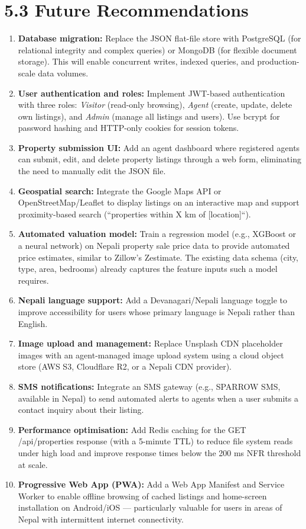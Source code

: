 \documentclass[12pt,a4paper]{report}
\begin{document}
\section{5.3 Future Recommendations}
\begin{enumerate}
  \item \textbf{Database migration:} Replace the JSON flat-file store with PostgreSQL (for relational integrity and complex queries) or MongoDB (for flexible document storage). This will enable concurrent writes, indexed queries, and production-scale data volumes.
  \item \textbf{User authentication and roles:} Implement JWT-based authentication with three roles: \textit{Visitor} (read-only browsing), \textit{Agent} (create, update, delete own listings), and \textit{Admin} (manage all listings and users). Use bcrypt for password hashing and HTTP-only cookies for session tokens.
  \item \textbf{Property submission UI:} Add an agent dashboard where registered agents can submit, edit, and delete property listings through a web form, eliminating the need to manually edit the JSON file.
  \item \textbf{Geospatial search:} Integrate the Google Maps API or OpenStreetMap/Leaflet to display listings on an interactive map and support proximity-based search (``properties within X km of [location]``).
  \item \textbf{Automated valuation model:} Train a regression model (e.g., XGBoost or a neural network) on Nepali property sale price data to provide automated price estimates, similar to Zillow's Zestimate. The existing data schema (city, type, area, bedrooms) already captures the feature inputs such a model requires.
  \item \textbf{Nepali language support:} Add a Devanagari/Nepali language toggle to improve accessibility for users whose primary language is Nepali rather than English.
  \item \textbf{Image upload and management:} Replace Unsplash CDN placeholder images with an agent-managed image upload system using a cloud object store (AWS S3, Cloudflare R2, or a Nepali CDN provider).
  \item \textbf{SMS notifications:} Integrate an SMS gateway (e.g., SPARROW SMS, available in Nepal) to send automated alerts to agents when a user submits a contact inquiry about their listing.
  \item \textbf{Performance optimisation:} Add Redis caching for the GET /api/properties response (with a 5-minute TTL) to reduce file system reads under high load and improve response times below the 200 ms NFR threshold at scale.
  \item \textbf{Progressive Web App (PWA):} Add a Web App Manifest and Service Worker to enable offline browsing of cached listings and home-screen installation on Android/iOS --- particularly valuable for users in areas of Nepal with intermittent internet connectivity.
\end{enumerate}
\end{document}
